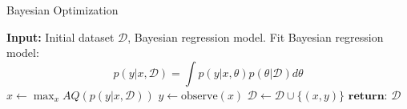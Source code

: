 \begin{tcolorbox}
\end{tcolorbox}


\begin{algorithm}[H]
    \caption{Bayesian Optimization}
    \begin{algorithmic}
    \State \textbf{Input:} Initial dataset $\mathcal{D}$, Bayesian regression model.
        \State Fit Bayesian regression model: $$p(y|x,\mathcal{D}) = \int p(y|x,\theta)p(\theta|\mathcal{D})d\theta$$
        \State $x \gets \max_x AQ(p(y|x,\mathcal{D}))$
        \State $y \gets \text{observe}(x)$ 
        \State $\mathcal{D} \gets \mathcal{D} \cup \{(x,y)\} $ 
    \EndWhile
    \State $\textbf{return: } \mathcal{D}$
    \end{algorithmic}
\end{algorithm}


